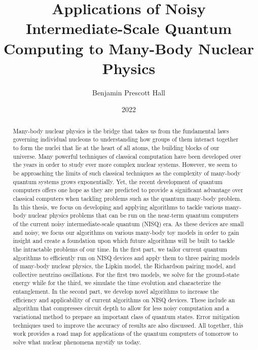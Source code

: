 \documentclass[10pt]{article}
\title{Applications of Noisy Intermediate-Scale Quantum Computing to Many-Body Nuclear Physics}
\author{Benjamin Prescott Hall}
\date{2022}
\begin{document}
\frontmatter

\maketitlepage

\begin{abstract}

\quad Many-body nuclear physics is the bridge that takes us from the fundamental laws governing individual nucleons to understanding how groups of them interact together to form the nuclei that lie at the heart of all atoms, the building blocks of our universe. Many powerful techniques of classical computation have been developed over the years in order to study ever more complex nuclear systems. However, we seem to be approaching the limits of such classical techniques as the complexity of many-body quantum systems grows exponentially. Yet, the recent development of quantum computers offers one hope as they are predicted to provide a significant advantage over classical computers when tackling problems such as the quantum many-body problem. In this thesis, we focus on developing and applying algorithms to tackle various many-body nuclear physics problems that can be run on the near-term quantum computers of the current noisy intermediate-scale quantum (NISQ) era. As these devices are small and noisy, we focus our algorithms on various many-body toy models in order to gain insight and create a foundation upon which future algorithms will be built to tackle the intractable problems of our time. In the first part, we tailor current quantum algorithms to efficiently run on NISQ devices and apply them to three pairing models of many-body nuclear physics, the Lipkin model, the Richardson pairing model, and collective neutrino oscillations. For the first two models, we solve for the ground-state energy while for the third, we simulate the time evolution and characterize the entanglement. In the second part, we develop novel algorithms to increase the efficiency and applicability of current algorithms on NISQ devices. These include an algorithm that compresses circuit depth to allow for less noisy computation and a variational method to prepare an important class of quantum states. Error mitigation techniques used to improve the accuracy of results are also discussed. All together, this work provides a road map for applications of the quantum computers of tomorrow to solve what nuclear phenomena mystify us today.
\end{abstract}

\clearpage

\end{document}
